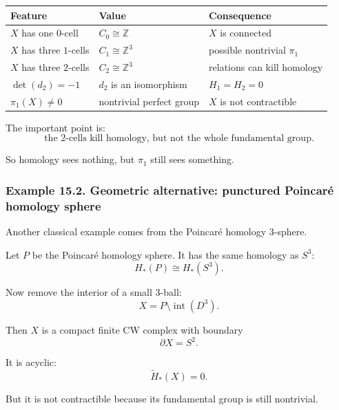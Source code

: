 \documentclass[12pt,a4paper]{article}
\theoremstyle{notespace}
\begin{document}
\begin{center}
	\renewcommand{\arraystretch}{1.25}
	\begin{tabular}{p{4.1cm}|p{4.1cm}|p{5.0cm}}
		\textbf{Feature} & \textbf{Value} & \textbf{Consequence}\\
		\hline
		\(X\) has one \(0\)-cell & \(C_0\cong \mathbb Z\) & \(X\) is connected\\
		\hline
		\(X\) has three \(1\)-cells & \(C_1\cong \mathbb Z^3\) & possible nontrivial \(\pi_1\)\\
		\hline
		\(X\) has three \(2\)-cells & \(C_2\cong \mathbb Z^3\) & relations can kill homology\\
		\hline
		\(\det(d_2)=-1\) & \(d_2\) is an isomorphism & \(H_1=H_2=0\)\\
		\hline
		\(\pi_1(X)\neq 0\) & nontrivial perfect group & \(X\) is not contractible
	\end{tabular}
\end{center}

The important point is:
\[
\text{the \(2\)-cells kill homology, but not the whole fundamental group.}
\]

So homology sees nothing, but \(\pi_1\) still sees something.

\subsubsection*{Example 15.2. Geometric alternative: punctured Poincaré homology sphere}

Another classical example comes from the Poincaré homology \(3\)-sphere.

Let \(P\) be the Poincaré homology sphere. It has the same homology as \(S^3\):
\[
H_*(P)\cong H_*(S^3).
\]

Now remove the interior of a small \(3\)-ball:
\[
X=P\setminus \operatorname{int}(D^3).
\]

Then \(X\) is a compact finite CW complex with boundary
\[
\partial X=S^2.
\]

It is acyclic:
\[
\widetilde H_*(X)=0.
\]

But it is not contractible because its fundamental group is still nontrivial.
\end{document}
